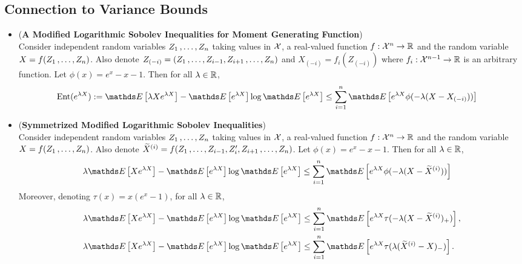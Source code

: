 \documentclass[11pt]{article}
\begin{document}
\subsection{Connection to Variance Bounds}
\begin{itemize}
\item \begin{proposition} (\textbf{A Modified Logarithmic Sobolev Inequalities for Moment Generating Function}) \citep{boucheron2013concentration}\\
Consider independent random variables $Z_1 \,{,}\ldots{,}\, Z_n$ taking values in ${\mathcal X}$, a real-valued function $f: {\mathcal X}^n \to {\mathbb R}$ and the random variable $X = f(Z_1 \,{,}\ldots{,}\, Z_n)$. Also denote $Z_{(-i)}= (Z_1 \,{,}\ldots{,}\, Z_{i-1}, Z_{i+1} \,{,}\ldots{,}\, Z_n)$ and $X_{(-i)} = f_i(Z_{(-i)})$ where $f_i: {\mathcal X}^{n-1} \to {\mathbb R}$ is an arbitrary function. Let $\phi(x) = e^x -x -1$.
Then for all $\lambda \in {\mathbb R}$,
\begin{align}
\text{Ent}(e^{\lambda X}) := \E{}{\lambda Xe^{\lambda X}} - \E{}{e^{\lambda X}}\log\E{}{e^{\lambda X}} &\le \sum_{i=1}^{n}\E{}{e^{\lambda X}\phi(-\lambda(X - X_{(-i)}))}\label{ineqn: log_sobolev_inequality_mgf}
\end{align}
\end{proposition}


\item \begin{proposition} (\textbf{Symmetrized Modified Logarithmic Sobolev Inequalities}) \citep{boucheron2013concentration}\\
Consider independent random variables $Z_1 \,{,}\ldots{,}\, Z_n$ taking values in ${\mathcal X}$, a real-valued function $f: {\mathcal X}^n \to {\mathbb R}$ and the random variable $X = f(Z_1 \,{,}\ldots{,}\, Z_n)$. Also denote $\widetilde{X}^{(i)} = f(Z_1 \,{,}\ldots{,}\, Z_{i-1}, Z_i', Z_{i+1} \,{,}\ldots{,}\, Z_n)$. Let $\phi(x) = e^x -x -1$.
Then for all $\lambda \in {\mathbb R}$,
\begin{align}
\lambda \E{}{Xe^{\lambda X}} - \E{}{e^{\lambda X}}\log\E{}{e^{\lambda X}} &\le \sum_{i=1}^{n}\E{}{e^{\lambda X}\phi(-\lambda(X - \widetilde{X}^{(i)}))}\label{ineqn: log_sobolev_inequality_sym_mgf}
\end{align} Moreover, denoting $\tau(x) = x(e^x - 1)$, for all $\lambda \in {\mathbb R}$,
\begin{align*}
\lambda \E{}{Xe^{\lambda X}} - \E{}{e^{\lambda X}}\log\E{}{e^{\lambda X}} &\le \sum_{i=1}^{n}\E{}{e^{\lambda X}\tau(-\lambda(X - \widetilde{X}^{(i)})_{+})},\\
\lambda \E{}{Xe^{\lambda X}} - \E{}{e^{\lambda X}}\log\E{}{e^{\lambda X}} &\le \sum_{i=1}^{n}\E{}{e^{\lambda X}\tau(\lambda(\widetilde{X}^{(i)} - X)_{-})}.
\end{align*}
\end{proposition}


\end{itemize}
\end{document}
